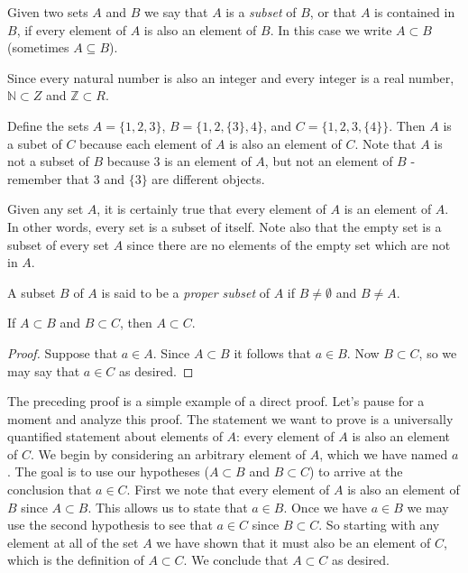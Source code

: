 \begin{definition}
Given two sets $A$ and $B$ we say that $A$ is a \emph{subset} of $B$, or that $A$ is contained in $B$, if every element of $A$ is also an element of $B$.  In this case we write $A\subset B$ (sometimes $A\subseteq B$).
\end{definition}

Since every natural number is also an integer and every integer is a real number, $\mathbb N\subset Z$ and $\mathbb Z\subset R$.

\begin{example}
Define  the sets $A=\{1,2,3\}$, $B=\bigl\{1,2,\{3\},4\bigr\}$, and $C=\bigl\{1,2,3,\{4\}\bigr\}$. Then $A$ is a subet of $C$ because each element of $A$ is also an element of $C$. Note that $A$ is not a subset of $B$ because $3$ is an element of $A$, but not an element of $B$ - remember that $3$ and $\{3\}$ are different objects.
\end{example}

Given any set $A$, it is certainly true that every element of $A$ is an
element of $A$.  In other words, every set is a subset of itself.  Note
also that the empty set is a subset of every set $A$ since there are no
elements of the empty set which are not in $A$.  

\begin{definition}
A subset $B$ of $A$ is said to be a \emph{proper subset}  of $A$ if $B\neq\emptyset$ and $B\neq A$.
\end{definition}

\begin{thrm}\label{sets:transitivity}
If $A\subset B$ and $B\subset C$, then $A\subset C$.
\end{thrm}

\begin{proof}
Suppose that $a\in A$.  Since $A\subset B$ it follows that $a\in B$. Now
$B\subset C$, so we may say that $a\in C$ as desired.
\end{proof}

The preceding proof is a simple example of a direct proof.  Let's pause for a moment and analyze this proof.  The statement we want to prove is a universally quantified statement about elements of $A$: every element of $A$ is also an element of $C$.  We begin by considering an arbitrary element of $A$, which we have named $a$.  The goal is to use our
hypotheses ($A\subset B$ and $B\subset C$) to arrive at the conclusion that $a\in C$.  First we note that every element of $A$ is also an element of $B$ since $A\subset B$.  This allows us to state that $a\in B$.  Once we have $a\in B$ we may use the second hypothesis to see that $a\in C$ since $B\subset C$.  So starting with any element at all of the set $A$ we have shown that it must also be an element of $C$, which is the definition of $A\subset C$.  We conclude that $A\subset C$ as desired.

